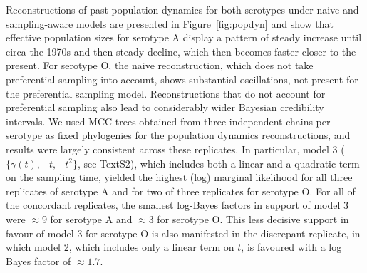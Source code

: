 \documentclass[10pt]{article}
\begin{document}
Reconstructions of past population dynamics for both serotypes under naive and sampling-aware models are presented in Figure~\ref{fig:popdyn} and show that effective population sizes for serotype A display a pattern of steady increase until circa the 1970s and then steady decline, which then becomes faster closer to the present.
For serotype O, the naive reconstruction, which does not take preferential sampling into account, shows substantial oscillations, not present for the preferential sampling model.
Reconstructions that do not account for preferential sampling also lead to considerably wider Bayesian credibility intervals.
We used MCC trees obtained from three independent chains per serotype as fixed phylogenies for the population dynamics reconstructions, and results were largely consistent across these replicates. %
In particular, model 3 ($\{\gamma(t), -t, -t^2\}$, see TextS2), which includes both a linear and a quadratic term on the sampling time, yielded the highest (log) marginal likelihood for all three replicates of serotype A and for two of three replicates for serotype O.
For all of the concordant replicates, the smallest log-Bayes factors in support of model 3 were $\approx 9$ for serotype A and $\approx 3$ for serotype O.
This less decisive support in favour of model 3 for serotype O is also manifested in the discrepant replicate, in which model 2, which includes only a linear term on $t$, is favoured with a log Bayes factor of $\approx 1.7$. %
\end{document}
